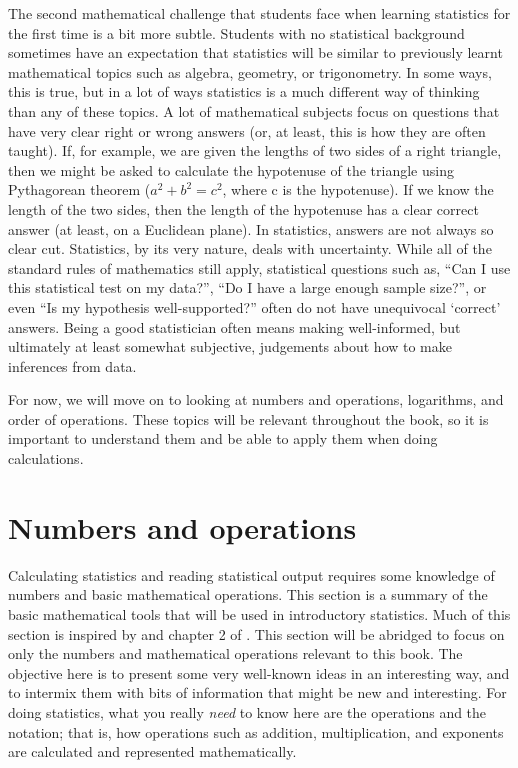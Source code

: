 \documentclass[
  openany]{scrbook}
\begin{document}
The second mathematical challenge that students face when learning statistics for the first time is a bit more subtle.
Students with no statistical background sometimes have an expectation that statistics will be similar to previously learnt mathematical topics such as algebra, geometry, or trigonometry.
In some ways, this is true, but in a lot of ways statistics is a much different way of thinking than any of these topics.
A lot of mathematical subjects focus on questions that have very clear right or wrong answers (or, at least, this is how they are often taught).
If, for example, we are given the lengths of two sides of a right triangle, then we might be asked to calculate the hypotenuse of the triangle using Pythagorean theorem (\(a^{2} + b^{2} = c^{2}\), where c is the hypotenuse).
If we know the length of the two sides, then the length of the hypotenuse has a clear correct answer (at least, on a Euclidean plane).
In statistics, answers are not always so clear cut.
Statistics, by its very nature, deals with uncertainty.
While all of the standard rules of mathematics still apply, statistical questions such as, ``Can I use this statistical test on my data?'', ``Do I have a large enough sample size?'', or even ``Is my hypothesis well-supported?'' often do not have unequivocal `correct' answers.
Being a good statistician often means making well-informed, but ultimately at least somewhat subjective, judgements about how to make inferences from data.

For now, we will move on to looking at numbers and operations, logarithms, and order of operations.
These topics will be relevant throughout the book, so it is important to understand them and be able to apply them when doing calculations.

\hypertarget{numbers-and-operations}{%
\section{Numbers and operations}\label{numbers-and-operations}}

Calculating statistics and reading statistical output requires some knowledge of numbers and basic mathematical operations.
This section is a summary of the basic mathematical tools that will be used in introductory statistics.
Much of this section is inspired by \citet{Courant1996} and chapter 2 of \citet{Pastor2008}.
This section will be abridged to focus on only the numbers and mathematical operations relevant to this book.
The objective here is to present some very well-known ideas in an interesting way, and to intermix them with bits of information that might be new and interesting.
For doing statistics, what you really \emph{need} to know here are the operations and the notation; that is, how operations such as addition, multiplication, and exponents are calculated and represented mathematically.
\end{document}

